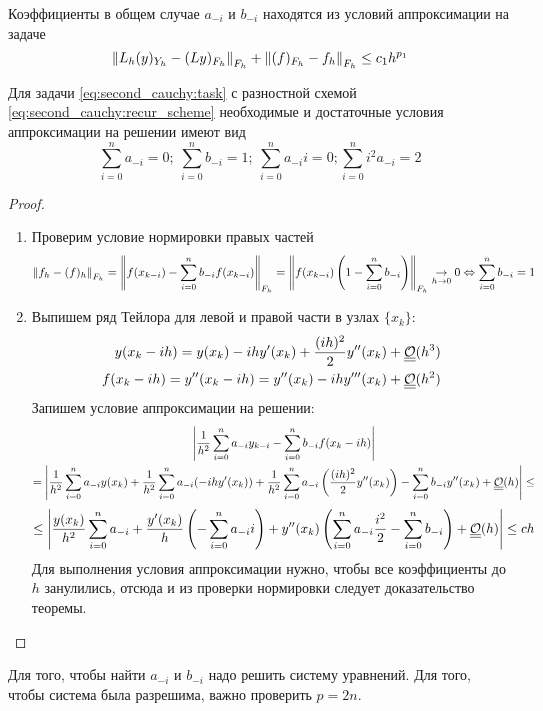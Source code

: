 Коэффициенты в общем случае $a_{-i}$ и $b_{-i}$ находятся из условий
аппроксимации на задаче
\[\left\lVert L_h(y)_{Y_h} - (Ly)_{F_h}\right\rVert_{F_h}+\left\lVert(f)_{F_h}-f_h\right\rVert_{F_h}\leq c_1h^{p_1}\]

\begin{theorem}
  Для задачи \eqref{eq:second_cauchy:task} с разностной схемой \eqref{eq:second_cauchy:recur_scheme}
  необходимые и достаточные условия аппроксимации на решении имеют вид
  \[\sum_{i=0}^na_{-i}=0;\ \sum_{i=0}^nb_{-i}=1;\ \sum_{i=0}^na_{-i}i=0;\sum_{i=0}^ni^2a_{-i}=2\]
\end{theorem}
\begin{proof}
  \begin{enumerate}
    \item Проверим условие нормировки правых частей
          \[\left\lVert f_h-(f)_h\right\rVert_{F_h}=\left\lVert f(x_{k-i})-\sum_{i=0}^nb_{-i}f(x_{k-i})\right\rVert_{F_h}=\left\lVert f(x_{k-i})\left(1-\sum_{i=0}^nb_{-i}\right)\right\rVert_{F_h}\underset{h\rightarrow0}{\rightarrow}0\Leftrightarrow\sum_{i=0}^nb_{-i}=1\]
    \item Выпишем ряд Тейлора для левой и правой части в узлах $\{x_k\}$:
          \begin{align*}
            y(x_k-ih)=y(x_k)-ihy'(x_k)+\frac{(ih)^2}{2}y''(x_k) + \underline{\underline{\mathcal{O}}}(h^3) \\
            f(x_k-ih)=y''(x_k-ih)=y''(x_k)-ihy'''(x_k) + \underline{\underline{\mathcal{O}}}(h^2)          \\
          \end{align*}
          Запишем условие аппроксимации на решении:
          \begin{multline*}
            \left\lvert\frac{1}{h^2}\sum_{i=0}^na_{-i}y_{k-i}-\sum_{i=0}^nb_{-i}f(x_k-ih)\right\rvert \\
            = \left|\frac{1}{h^2}\sum_{i=0}^na_{-i}y(x_k)+\frac{1}{h^2}\sum_{i=0}^na_{-i}(-ihy'(x_k))+\frac{1}{h^2}\sum_{i=0}^na_{-i}\left(\frac{(ih)^2}{2}y''(x_k)\right)
            -\sum_{i=0}^nb_{-i}y''(x_k)+\underline{\underline{\mathcal{O}}}(h)\right|\leq
          \end{multline*}
          \[ \leq\left\lvert\frac{y(x_k)}{h^2}\sum_{i=0}^na_{-i}+\frac{y'(x_k)}{h}\left(-\sum_{i=0}^na_{-i}i\right)+y''(x_k)\left(\sum_{i=0}^na_{-i}\frac{i^2}{2}-\sum_{i=0}^nb_{-i}\right)+\underline{\underline{\mathcal{O}}}(h)\right\rvert\leq ch \]
          Для выполнения условия аппроксимации нужно, чтобы все коэффициенты до $h$ занулились, отсюда
          и из проверки нормировки следует доказательство теоремы.
  \end{enumerate}
\end{proof}
\begin{remark}
  Для того, чтобы найти $a_{-i}$ и $b_{-i}$ надо решить систему уравнений.
  Для того, чтобы система была разрешима, важно проверить $p=2n$.
\end{remark}

